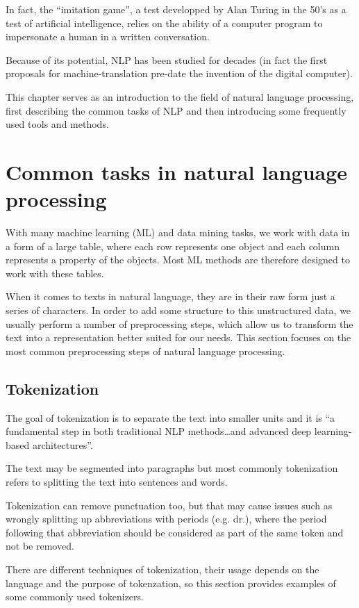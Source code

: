 In fact, the ``imitation game'', a test developped by Alan Turing in the 50's as a test of artificial intelligence, relies on the ability of a computer program to impersonate a human in a written conversation.\cite{turing}


Because of its potential, NLP has been studied for decades (in fact the first proposals for machine-translation pre-date the invention of the digital computer\cite{nlp_history}). 

This chapter serves as an introduction to the field of natural language processing, first describing the common tasks of NLP and then introducing some frequently used tools and methods.
\section{Common tasks in natural language processing}
With many machine learning (ML) and data mining tasks, we work with data in a form of a large table, where each row represents one object and each column represents a property of the objects. Most ML methods are therefore designed to work with these tables. 

When it comes to texts in natural language, they are in their raw form just a series of characters. In order to add some structure to this unstructured data, we usually perform a number of preprocessing steps, which allow us to transform the text into a representation better suited for our needs. This section focuses on the most common preprocessing steps of natural language processing.

\subsection{Tokenization}
The goal of tokenization is to separate the text into smaller units and it is ``a fundamental step in both traditional NLP methods\ldots and advanced deep learning-based architectures''.\cite{tokenization}

The text may be segmented into paragraphs but most commonly tokenization refers to splitting the text into sentences and words. 

Tokenization can remove punctuation too, but that may cause issues such as wrongly splitting up abbreviations with periods (e.g. dr.), where the period following that abbreviation should be considered as part of the same token and not be removed.\cite{nlp_tasks}

There are different techniques of tokenization, their usage depends on the language and the purpose of tokenzation, so this section provides examples of some commonly used tokenizers.
